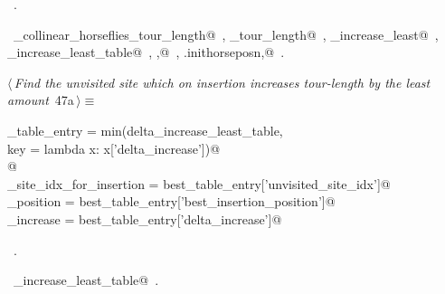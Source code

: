 \documentclass[11.5pt]{report}
\begin{document}
\begin{flushleft}
\begin{list}{}{}
\mbox{}\verb@                                   'delta_increase'          : delta_increase_least})@\\
\mbox{}\verb@@{\NWsep}
\end{list}
\vspace{-1.5ex}
\footnotesize
\begin{list}{}{\setlength{\itemsep}{-\parsep}\setlength{\itemindent}{-\leftmargin}}
\item \NWtxtMacroRefIn\ .
\item \NWtxtIdentsUsed\nobreak\  \verb@compute_collinear_horseflies_tour_length@\nobreak\ , \verb@current_tour_length@\nobreak\ , \verb@delta_increase_least@\nobreak\ , \verb@delta_increase_least_table@\nobreak\ , \verb@ibest,@\nobreak\ , \verb@self.inithorseposn,@\nobreak\ .
\item{}
\end{list}
\vspace{4ex}
\end{flushleft}


\vspace{-0.8cm}\newchunk 

\begin{flushleft} \small\label{scrap72}\raggedright\small
{} $\langle\,${\itshape Find the unvisited site which on insertion increases tour-length by the least amount}\nobreak\ {\footnotesize {47a}}$\,\rangle\equiv$
\vspace{-1ex}
\begin{list}{}{} \item
\mbox{}\verb@best_table_entry = min(delta_increase_least_table, \@\\
\mbox{}\verb@                         key = lambda x: x['delta_increase'])@\\
\mbox{}\verb@         @\\
\mbox{}\verb@unvisited_site_idx_for_insertion = best_table_entry['unvisited_site_idx']@\\
\mbox{}\verb@insertion_position               = best_table_entry['best_insertion_position']@\\
\mbox{}\verb@delta_increase                   = best_table_entry['delta_increase']@\\
\mbox{}\verb@@{\NWsep}
\end{list}
\vspace{-1.5ex}
\footnotesize
\begin{list}{}{\setlength{\itemsep}{-\parsep}\setlength{\itemindent}{-\leftmargin}}
\item \NWtxtMacroRefIn\ .
\item \NWtxtIdentsUsed\nobreak\  \verb@delta_increase_least_table@\nobreak\ .
\item{}
\end{list}
\vspace{4ex}
\end{flushleft}
\end{document}
